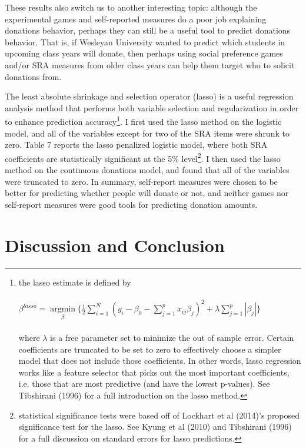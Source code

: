 \documentclass[12pt]{article}
\begin{document}
These results also switch us to another interesting topic: although the experimental games and self-reported measures do a poor job explaining donations behavior, perhaps they can still be a useful tool to predict donations behavior. That is, if Wesleyan University wanted to predict which students in upcoming class years will donate, then perhaps using social preference games and/or SRA measures from older class years can help them target who to solicit donations from. 

The least absolute shrinkage and selection operator (lasso) is a useful regression analysis method that performs both variable selection and regularization in order to enhance prediction accuracy\footnote{ 
the lasso estimate is defined by \\ \\
\( \beta^{lasso}=\mathop\mathrm{argmin}\limits_{\beta} \{ \frac{1}{2} \sum_{i=1}^{N} (y_{i} - \beta_{0} - \sum_{j=1}^{p}x_{ij}\beta _{j})^{2}+\lambda\sum_{j=1}^{p}|\beta _{j}|\} \) \\ \\
where \(\lambda\) is a free parameter set to minimize the out of sample error. Certain coefficients are truncated to be set to zero to effectively choose a simpler model that does not include those coefficients. In other words, lasso regression works like a feature selector that picks out the most important coefficients, i.e. those that are most predictive (and have the lowest p-values). See Tibshirani (1996) for a full introduction on the lasso method.}.
I first used the lasso method on the logistic model, and all of the variables except for two of the SRA items were shrunk to zero. Table 7 reports the lasso penalized logistic model, where both SRA coefficients are statistically significant at the 5\% level\footnote{statistical significance tests were based off of Lockhart et al (2014)\rq s proposed significance test for the lasso. See Kyung et al (2010) and Tibshirani (1996) for a full discussion on standard errors for lasso predictions.}. I then used the lasso method on the continuous donations model, and found that all of the variables were truncated to zero. In summary, self-report measures were chosen to be better for predicting whether people will donate or not, and neither games nor self-report measures were good tools for predicting donation amounts.



\section{Discussion and Conclusion}
\end{document}
